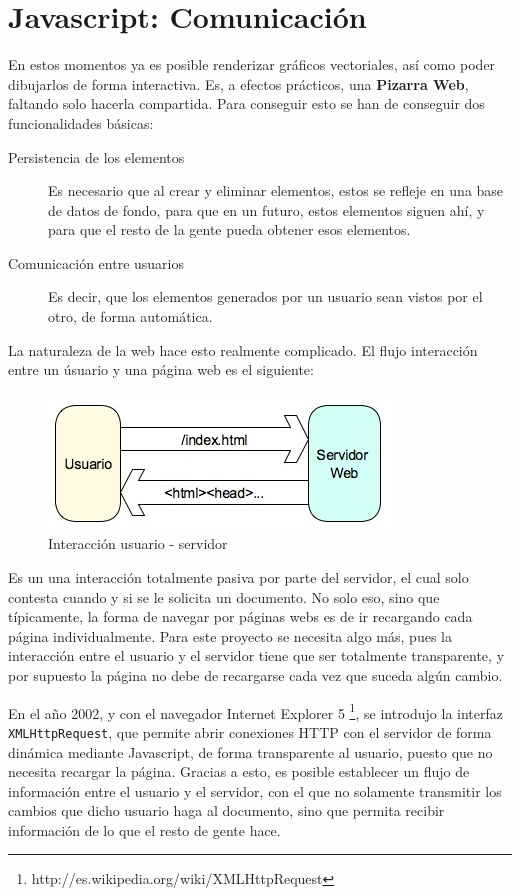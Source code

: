 \section{Javascript: Comunicación} %
\label{sec:javascript_comunicacion}
En estos momentos ya es posible renderizar gráficos vectoriales, así como poder dibujarlos de forma interactiva. Es, a efectos prácticos, una \textbf{Pizarra Web}, faltando solo hacerla compartida. Para conseguir esto se han de conseguir dos funcionalidades básicas:

\begin{description}
  \item[Persistencia de los elementos] Es necesario que al crear y eliminar elementos, estos se refleje en una base de datos de fondo, para que en un futuro, estos elementos siguen ahí, y para que el resto de la gente pueda obtener esos elementos.
  \item[Comunicación entre usuarios] Es decir, que los elementos generados por un usuario sean vistos por el otro, de forma automática.
\end{description}

La naturaleza de la web hace esto realmente complicado. El flujo interacción entre un úsuario y una página web es el siguiente:

\begin{figure}[h!]
\centering
\includegraphics{navigation.png}
\caption{Interacción usuario - servidor}\label{fig:navigation}
\end{figure}

Es un una interacción totalmente pasiva por parte del servidor, el cual solo contesta cuando y si se le solicita un documento. No solo eso, sino que típicamente, la forma de navegar por páginas webs es de ir recargando cada página individualmente. Para este proyecto se necesita algo más, pues la interacción entre el usuario y el servidor tiene que ser totalmente transparente, y por supuesto la página no debe de recargarse cada vez que suceda algún cambio.

En el año 2002, y con el navegador Internet Explorer 5 \footnote{http://es.wikipedia.org/wiki/XMLHttpRequest}, se introdujo la interfaz \texttt{XMLHttpRequest}, que permite abrir conexiones  HTTP con el servidor de forma dinámica mediante Javascript, de forma transparente al usuario, puesto que no necesita recargar la página. Gracias a esto, es posible establecer un flujo de información entre el usuario y el servidor, con el que no solamente transmitir los cambios que dicho usuario haga al documento, sino que permita recibir información de lo que el resto de gente hace.


